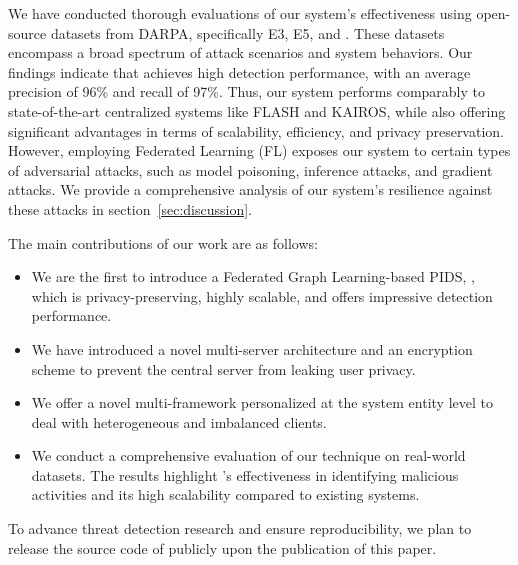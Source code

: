 


We have conducted thorough evaluations of our system's effectiveness using open-source datasets from DARPA, specifically E3, E5, and \optc. These datasets encompass a broad spectrum of attack scenarios and system behaviors. Our findings indicate that \Sys achieves high detection performance, with an average precision of 96\% and recall of 97\%. Thus, our system performs comparably to state-of-the-art centralized systems like FLASH and KAIROS, while also offering significant advantages in terms of scalability, efficiency, and privacy preservation. However, employing Federated Learning (FL) exposes our system to certain types of adversarial attacks, such as model poisoning, inference attacks, and gradient attacks. We provide a comprehensive analysis of our system's resilience against these attacks in section~\ref{sec:discussion}.


The main contributions of our work are as follows:

\begin{itemize}[topsep=.1ex,itemsep=-.1ex,leftmargin=*]
    \item We are the first to introduce a Federated Graph Learning-based PIDS, \Sys, which is privacy-preserving, highly scalable, and offers impressive detection performance.
    \item We have introduced a novel multi-server architecture and an encryption scheme to prevent the central server from leaking user privacy.
    \item We offer a novel multi-\gnnshort framework personalized at the system entity level to deal with heterogeneous and imbalanced clients.
    \item We conduct a comprehensive evaluation of our technique on real-world datasets. The results highlight \Sys's effectiveness in identifying malicious activities and its high scalability compared to existing systems.
\end{itemize}

 To advance threat detection research and ensure reproducibility, we plan to release the source code of \Sys publicly upon the publication of this paper.